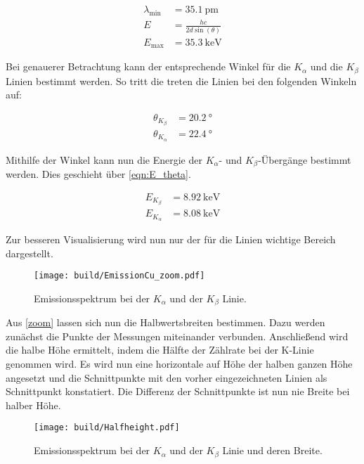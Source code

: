\begin{align}
    \lambda_\text{min} &=\qty{35.1}{\pico \meter}\\
    \label{eqn:E_theta}
    E &= \frac{hc}{2 d \sin(\theta)}\\
    E_\text{max} &= \qty{35.3}{\kilo \electronvolt}
\end{align}

\noindent Bei genauerer Betrachtung kann der entsprechende Winkel für die $K_\alpha$ und die $K_\beta$ Linien bestimmt werden. So tritt die treten die 
Linien bei den folgenden Winkeln auf:

\begin{align}
    \theta_{K_\beta} &= \qty{20.2}{\degree}\\ 
    \theta_{K_\alpha}  &= \qty{22.4}{\degree} 
\end{align}
    
\noindent Mithilfe der Winkel kann nun die Energie der $K_\alpha$- und  $K_\beta$-Übergänge bestimmt werden. Dies geschieht über \autoref{eqn:E_theta}.

\begin{align}
    E_{K_\beta} &= \qty{8.92}{\kilo \electronvolt}\\ 
    E_{K_\alpha}  &= \qty{8.08}{\kilo \electronvolt} 
\end{align}

\noindent Zur besseren Visualisierung wird nun nur der für die Linien wichtige Bereich dargestellt. 

\begin{figure}[H]
    \centering
    \texttt{[image: build/EmissionCu\_zoom.pdf]}
    \caption{Emissionsspektrum bei der $K_\alpha$ und der $K_\beta$ Linie.}
    \label{zoom}
\end{figure}    

\noindent Aus \autoref{zoom} lassen sich nun die Halbwertsbreiten bestimmen. Dazu werden zunächst die Punkte der Messungen miteinander verbunden. 
Anschließend wird die halbe Höhe ermittelt, indem die Hälfte der Zählrate bei der K-Linie genommen wird. Es wird nun eine horizontale auf Höhe der 
halben ganzen Höhe angesetzt und die Schnittpunkte mit den vorher eingezeichneten Linien als Schnittpunkt konstatiert. Die Differenz der Schnittpunkte 
ist nun nie Breite bei halber Höhe.

\begin{figure}[H]
    \centering
    \texttt{[image: build/Halfheight.pdf]}
    \caption{Emissionsspektrum bei der $K_\alpha$ und der $K_\beta$ Linie und deren Breite.}
\end{figure}    


